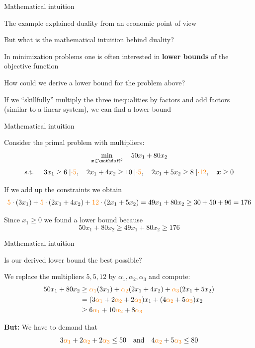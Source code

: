 \documentclass[11pt,compress,t,notes=noshow, xcolor=table]{beamer}
\begin{document}
\begin{framei}{Mathematical intuition}
\item The example explained duality from an economic point of view
\item But what is the mathematical intuition behind duality?
\vfill
\item[Idea:] In minimization problems one is often interested in \textbf{lower bounds} of the objective function
\item How could we derive a lower bound for the problem above?
\vfill
\item If we ``skillfully'' multiply the three inequalities by factors and add factors (similar to a linear system), we can find a lower bound
\end{framei}


\begin{framei}{Mathematical intuition}
\item Consider the primal problem with multipliers:
$$
\min_{\xv \in \R^2} \quad 50x_1 + 80x_2
$$
$$
\text{s.t. } \quad 3x_1 \ge 6 \;\vert\textcolor{orange}{\cdot 5}, \quad 2x_1 + 4x_2 \ge 10 \;\vert \textcolor{orange}{\cdot 5}, \quad 2x_1 + 5x_2 \ge 8 \;\vert \textcolor{orange}{\cdot 12}, \quad \bm{x} \ge 0
$$
\item If we add up the constraints we obtain
$$
\textcolor{orange}{5} \cdot (3x_1) + \textcolor{orange}{5} \cdot (2x_1 + 4x_2) + \textcolor{orange}{12} \cdot (2x_1 + 5x_2) = 49 x_1 + 80 x_2 \ge 30 + 50 + 96 = 176
$$
\item Since $x_1 \ge 0$ we found a lower bound because
$$50x_1 + 80 x_2 \ge 49 x_1 + 80 x_2 \ge 176$$
\end{framei}


\begin{framei}{Mathematical intuition}
\item Is our derived lower bound the best possible?
\item We replace the multipliers $5, 5, 12$ by $\alpha_1, \alpha_2, \alpha_3$ and compute:
\begin{align*}
50x_1 + 80x_2 &\ge \textcolor{orange}{\alpha_1} (3x_1) + \textcolor{orange}{\alpha_2} (2x_1 + 4x_2) + \textcolor{orange}{\alpha_3} (2x_1 + 5x_2) \\
&= (3 \textcolor{orange}{\alpha_1} + 2 \textcolor{orange}{\alpha_2} + 2 \textcolor{orange}{\alpha_3}) x_1 + (4 \textcolor{orange}{\alpha_2} + 5 \textcolor{orange}{\alpha_3}) x_2 \\
&\ge 6 \textcolor{orange}{\alpha_1} + 10 \textcolor{orange}{\alpha_2} + 8 \textcolor{orange}{\alpha_3}
\end{align*}
\item \textbf{But:} We have to demand that
$$3 \textcolor{orange}{\alpha_1} + 2  \textcolor{orange}{\alpha_2} + 2 \textcolor{orange}{\alpha_3} \le 50 \quad \text{and} \quad 4  \textcolor{orange}{\alpha_2} + 5 \textcolor{orange}{\alpha_3} \le 80$$
\end{framei}
\end{document}
